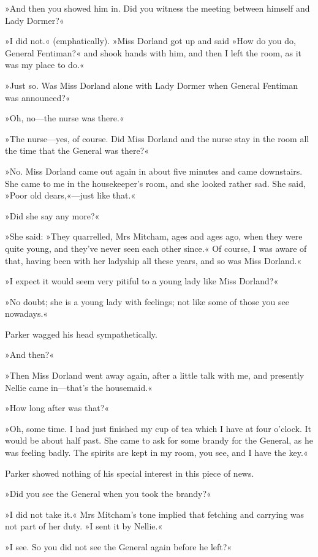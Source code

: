 »And then you showed him in. Did you witness the meeting between himself and Lady Dormer?«

»I did not.« (emphatically). »Miss Dorland got up and said »How do you do, General Fentiman?« and shook hands with him, and then I left the room, as it was my place to do.«

»Just so. Was Miss Dorland alone with Lady Dormer when General Fentiman was announced?«

»Oh, no—the nurse was there.«

»The nurse—yes, of course. Did Miss Dorland and the nurse stay in the room all the time that the General was there?«

»No. Miss Dorland came out again in about five minutes and came downstairs. She came to me in the housekeeper's room, and she looked rather sad. She said, »Poor old dears,«—just like that.«

»Did she say any more?«

»She said: »They quarrelled, Mrs Mitcham, ages and ages ago, when they were quite young, and they've never seen each other since.« Of course, I was aware of that, having been with her ladyship all these years, and so was Miss Dorland.«

»I expect it would seem very pitiful to a young lady like Miss Dorland?«

»No doubt; she is a young lady with feelings; not like some of those you see nowadays.«

Parker wagged his head sympathetically.

»And then?«

»Then Miss Dorland went away again, after a little talk with me, and presently Nellie came in—that's the housemaid.«

»How long after was that?«

»Oh, some time. I had just finished my cup of tea which I have at four o'clock. It would be about half past. She came to ask for some brandy for the General, as he was feeling badly. The spirits are kept in my room, you see, and I have the key.«

Parker showed nothing of his special interest in this piece of news.

»Did you see the General when you took the brandy?«

»I did not take it.« Mrs Mitcham's tone implied that fetching and carrying was not part of her duty. »I sent it by Nellie.«

»I see. So you did not see the General again before he left?«

